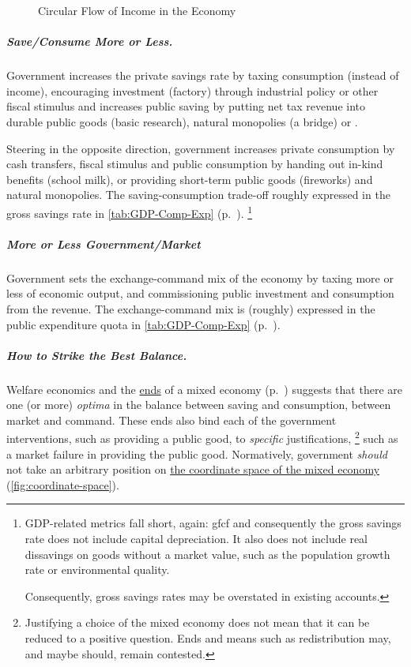 \begin{figure}[htbp]
	\centering
	\caption[Circular Flow in the Economy]{Circular Flow of Income in the Economy}
	\label{fig:circular-flow}
\end{figure}

\subparagraph[Save More or Less]{Save/Consume More or Less.}
Government increases the private savings rate by taxing consumption (instead of income), encouraging investment (factory) through industrial policy or other fiscal stimulus and increases public saving by putting net tax revenue into durable public goods (basic research), natural monopolies (a bridge) or .

Steering in the opposite direction, government increases private consumption by cash transfers, fiscal stimulus and public consumption by handing out in-kind benefits (school milk), or providing short-term public goods (fireworks) and natural monopolies.
The saving-consumption trade-off roughly expressed in the gross savings rate in \autoref{tab:GDP-Comp-Exp} (p.~\pageref{tab:GDP-Comp-Exp}).
\footnote{
	GDP-related metrics fall short, again:
	\gls{gfcf} and consequently the gross savings rate does not include capital depreciation.
	It also does not include real dissavings on goods without a market value, such as the population growth rate or environmental quality.

	Consequently, gross savings rates may be overstated in existing accounts.
}


\subparagraph[Exchange-Command Mix]{More or Less Government/Market}
Government sets the exchange-command mix of the economy by taxing more or less of economic output, and commissioning public investment and consumption from the revenue.
The exchange-command mix is (roughly) expressed in the public expenditure quota in \autoref{tab:GDP-Comp-Exp} (p.~\pageref{tab:GDP-Comp-Exp}).

\subparagraph[Optima]{How to Strike the Best Balance.}
Welfare economics and the \hyperref[sec:ends]{ends} of a mixed economy (p.~\pageref{sec:ends}) suggests that there are one (or more) \emph{optima} in the balance between saving and consumption, between market and command.
These ends also bind each of the government interventions, such as providing a public good, to \emph{specific} justifications,
\footnote{
	Justifying a choice of the mixed economy does not mean that it can be reduced to a positive question.
	Ends and means such as redistribution may, and maybe should, remain contested.
}
such as a market failure in providing the public good.
Normatively, government \emph{should} not take an arbitrary position on \hyperref[fig:coordinate-space]{the coordinate space of the mixed economy} (\autoref{fig:coordinate-space}).

